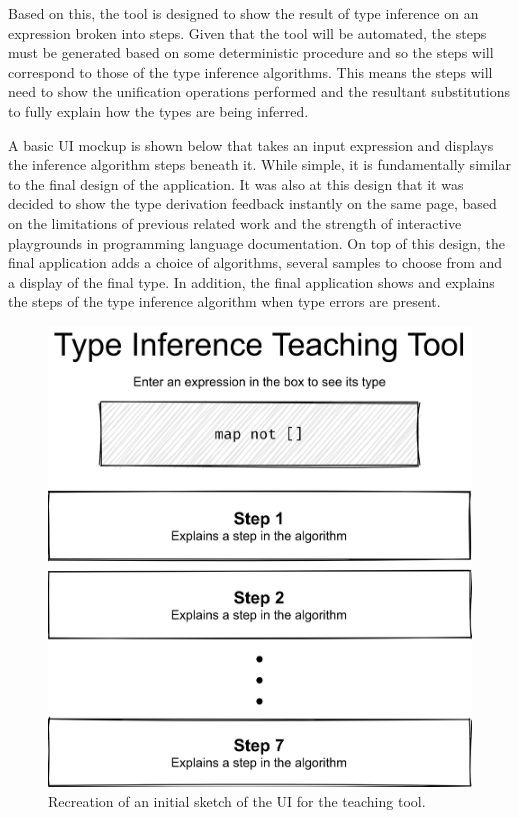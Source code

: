 \documentclass[a4paper,fleqn,oneside,12pt]{report}
\begin{document}
Based on this, the tool is designed to show the result of type inference on an expression broken into steps. Given that the tool will be automated, the steps must be generated based on some deterministic procedure and so the steps will correspond to those of the type inference algorithms. This means the steps will need to show the unification operations performed and the resultant substitutions to fully explain how the types are being inferred.

A basic UI mockup is shown below that takes an input expression and displays the inference algorithm steps beneath it. While simple, it is fundamentally similar to the final design of the application. It was also at this design that it was decided to show the type derivation feedback instantly on the same page, based on the limitations of previous related work and the strength of interactive playgrounds in programming language documentation. On top of this design, the final application adds a choice of algorithms, several samples to choose from and a display of the final type. In addition, the final application shows and explains the steps of the type inference algorithm when type errors are present.

{\centering \begin{figure}[h!]
  \centering
  \includegraphics[width=0.756\linewidth]{images/image21.png}
  \caption{Recreation of an initial sketch of the UI for the teaching tool.}
\end{figure} \par}
\end{document}
